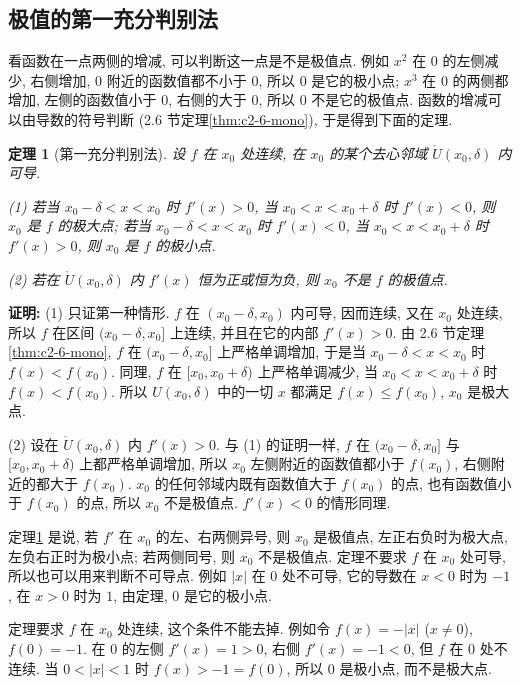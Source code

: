\documentclass[UTF8,openany]{ctexbook}
\theoremstyle{chinesetextbook}
\newtheorem{theorem}{定理}[section]
\newenvironment{cnproof}{\par\indent\textbf{证明:} \ignorespaces}{\par}
\begin{document}
\subsection{极值的第一充分判别法}
看函数在一点两侧的增减, 可以判断这一点是不是极值点. 例如 $x^2$ 在 $0$ 的左侧减少, 右侧增加, $0$ 附近的函数值都不小于 $0$, 所以 $0$ 是它的极小点; $x^3$ 在 $0$ 的两侧都增加, 左侧的函数值小于 $0$, 右侧的大于 $0$, 所以 $0$ 不是它的极值点. 函数的增减可以由导数的符号判断 (2.6 节定理\ref{thm:c2-6-mono}), 于是得到下面的定理.
\begin{theorem}[第一充分判别法]\label{thm:c2-9-first}
设 $f$ 在 $x_0$ 处连续, 在 $x_0$ 的某个去心邻域 $\mathring U(x_0,\delta)$ 内可导.

\textup{(1)} 若当 $x_0-\delta<x<x_0$ 时 $f'(x)>0$, 当 $x_0<x<x_0+\delta$ 时 $f'(x)<0$, 则 $x_0$ 是 $f$ 的极大点; 若当 $x_0-\delta<x<x_0$ 时 $f'(x)<0$, 当 $x_0<x<x_0+\delta$ 时 $f'(x)>0$, 则 $x_0$ 是 $f$ 的极小点.

\textup{(2)} 若在 $\mathring U(x_0,\delta)$ 内 $f'(x)$ 恒为正或恒为负, 则 $x_0$ 不是 $f$ 的极值点.
\end{theorem}
\begin{cnproof}
(1) 只证第一种情形. $f$ 在 $(x_0-\delta,x_0)$ 内可导, 因而连续, 又在 $x_0$ 处连续, 所以 $f$ 在区间 $(x_0-\delta,x_0]$ 上连续, 并且在它的内部 $f'(x)>0$. 由 2.6 节定理\ref{thm:c2-6-mono}, $f$ 在 $(x_0-\delta,x_0]$ 上严格单调增加, 于是当 $x_0-\delta<x<x_0$ 时 $f(x)<f(x_0)$. 同理, $f$ 在 $[x_0,x_0+\delta)$ 上严格单调减少, 当 $x_0<x<x_0+\delta$ 时 $f(x)<f(x_0)$. 所以 $U(x_0,\delta)$ 中的一切 $x$ 都满足 $f(x)\le f(x_0)$, $x_0$ 是极大点.

(2) 设在 $\mathring U(x_0,\delta)$ 内 $f'(x)>0$. 与 (1) 的证明一样, $f$ 在 $(x_0-\delta,x_0]$ 与 $[x_0,x_0+\delta)$ 上都严格单调增加, 所以 $x_0$ 左侧附近的函数值都小于 $f(x_0)$, 右侧附近的都大于 $f(x_0)$. $x_0$ 的任何邻域内既有函数值大于 $f(x_0)$ 的点, 也有函数值小于 $f(x_0)$ 的点, 所以 $x_0$ 不是极值点. $f'(x)<0$ 的情形同理.
\end{cnproof}
定理\ref{thm:c2-9-first} 是说, 若 $f'$ 在 $x_0$ 的左、右两侧异号, 则 $x_0$ 是极值点, 左正右负时为极大点, 左负右正时为极小点; 若两侧同号, 则 $x_0$ 不是极值点. 定理不要求 $f$ 在 $x_0$ 处可导, 所以也可以用来判断不可导点. 例如 $|x|$ 在 $0$ 处不可导, 它的导数在 $x<0$ 时为 $-1$, 在 $x>0$ 时为 $1$, 由定理, $0$ 是它的极小点.

定理要求 $f$ 在 $x_0$ 处连续, 这个条件不能去掉. 例如令 $f(x)=-|x|$ ($x\ne0$), $f(0)=-1$. 在 $0$ 的左侧 $f'(x)=1>0$, 右侧 $f'(x)=-1<0$, 但 $f$ 在 $0$ 处不连续. 当 $0<|x|<1$ 时 $f(x)>-1=f(0)$, 所以 $0$ 是极小点, 而不是极大点.
\end{document}
